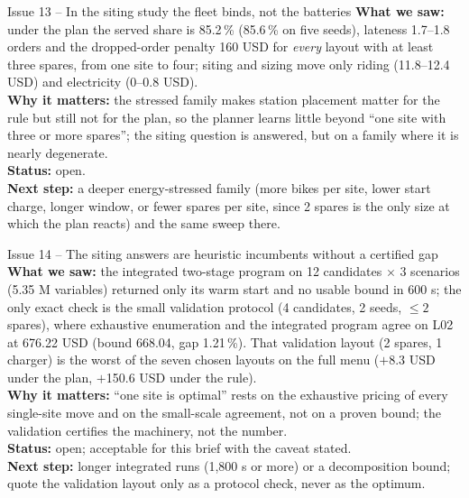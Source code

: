 \begin{issuebox}{Issue 13 -- In the siting study the fleet binds, not the batteries}
\textbf{What we saw:} under the plan the served share is 85.2\,\% (85.6\,\% on five seeds), lateness 1.7--1.8 orders and the dropped-order penalty 160 USD for \emph{every} layout with at least three spares, from one site to four; siting and sizing move only riding (11.8--12.4 USD) and electricity (0--0.8 USD).\\
\textbf{Why it matters:} the stressed family makes station placement matter for the rule but still not for the plan, so the planner learns little beyond ``one site with three or more spares''; the siting question is answered, but on a family where it is nearly degenerate.\\
\textbf{Status:} open.\\
\textbf{Next step:} a deeper energy-stressed family (more bikes per site, lower start charge, longer window, or fewer spares per site, since 2 spares is the only size at which the plan reacts) and the same sweep there.
\end{issuebox}

\begin{issuebox}{Issue 14 -- The siting answers are heuristic incumbents without a certified gap}
\textbf{What we saw:} the integrated two-stage program on 12 candidates $\times$ 3 scenarios (5.35 M variables) returned only its warm start and no usable bound in 600 s; the only exact check is the small validation protocol (4 candidates, 2 seeds, $\le 2$ spares), where exhaustive enumeration and the integrated program agree on L02 at 676.22 USD (bound 668.04, gap 1.21\,\%). That validation layout (2 spares, 1 charger) is the worst of the seven chosen layouts on the full menu ($+$8.3 USD under the plan, $+$150.6 USD under the rule).\\
\textbf{Why it matters:} ``one site is optimal'' rests on the exhaustive pricing of every single-site move and on the small-scale agreement, not on a proven bound; the validation certifies the machinery, not the number.\\
\textbf{Status:} open; acceptable for this brief with the caveat stated.\\
\textbf{Next step:} longer integrated runs (1,800 s or more) or a decomposition bound; quote the validation layout only as a protocol check, never as the optimum.
\end{issuebox}

